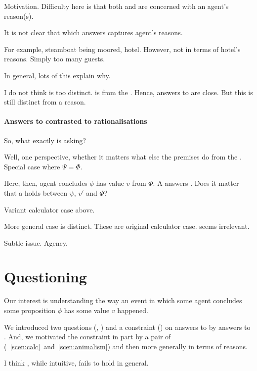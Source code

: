 \begin{note}
  Motivation.
  Difficulty here is that both \citeauthor{Davidson:1963aa} and \citeauthor{Hieronymi:2011aa} are concerned with an agent's reason(s).

  It is not clear that \ros{} which answers \qWhy{} captures agent's reasons.

  For example, steamboat being moored, hotel.
  However, not in terms of hotel's reasons.
  Simply too many guests.

  In general, lots of this explain why.

  I do not think \issueInclusion{} is too distinct.
  \ros{} is from the \agpe{}.
  Hence, answers to \qWhy{} are close.
  But this is still distinct from a reason.
\end{note}

\paragraph{Answers to \qWhy{} contrasted to rationalisations}

\begin{note}
  So, what exactly is \qWhy{} asking?

  Well, one perspective, whether it matters what else the premises do from the \agpe{}.
  Special case where \(\Psi = \Phi\).

  Here, then, agent concludes \(\phi\) has value \(v\) from \(\Phi\).
  A \ros{} answers \qWhy{}.
  Does it matter that a \ros{} holds between \(\psi\), \(v'\) and \(\Phi\)?

  Variant calculator case above.

  More general case is distinct.
  These are original calculator case.
  \ros{} seems irrelevant.
\end{note}

\begin{note}
  Subtle issue.
  Agency.
\end{note}

\section*{Questioning \issueInclusion{}}

\begin{note}
  Our interest is understanding the way an event in which some agent \vAgent{} concludes some proposition \(\phi\) has some value \(v\) happened.

  We introduced two questions (\qWhy{}, \qHow{}) and a constraint (\issueInclusion{}) on answers to \qWhy{} by answers to \qHow{}.
  And, we motivated the constraint in part by a pair of  (~\ref{scen:calc}~and~\ref{scen:animalism}) and then more generally in terms of reasons.

  I think \issueInclusion{}, while intuitive, fails to hold in general.
\end{note}

